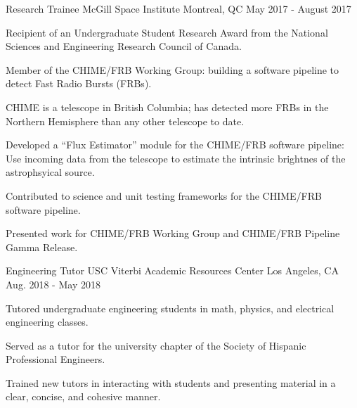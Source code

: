 \begin{cventries}
  \cventry
    {Research Trainee} %
    {McGill Space Institute} %
    {Montreal, QC} %
    {May 2017 - August 2017} %
    {
      \begin{cvitems} %
        \item {Recipient of an Undergraduate Student Research Award from the National Sciences and Engineering Research Council of Canada.}
        \item {Member of the CHIME/FRB Working Group: building a software pipeline to detect Fast Radio Bursts (FRBs).}
        \item {CHIME is a telescope in British Columbia; has detected more FRBs in the Northern Hemisphere than any other telescope to date.}
        \item {Developed a ``Flux Estimator'' module for the CHIME/FRB software pipeline: Use incoming data from the telescope to estimate the intrinsic brightnes of the astrophsyical source.}
        \item {Contributed to science and unit testing frameworks for the CHIME/FRB software pipeline.}
        \item {Presented work for CHIME/FRB Working Group and CHIME/FRB Pipeline Gamma Release.}
      \end{cvitems}
    }

    \cventry
    {Engineering Tutor} %
    {USC Viterbi Academic Resources Center} %
    {Los Angeles, CA} %
    {Aug. 2018 - May 2018} %
    {
      \begin{cvitems} %
        \item {Tutored undergraduate engineering students in math, physics, and electrical engineering classes.}
        \item {Served as a tutor for the university chapter of the Society of Hispanic Professional Engineers.}
        \item {Trained new tutors in interacting with students and presenting material in a clear, concise, and cohesive manner.}
      \end{cvitems}
    }


\end{cventries}
